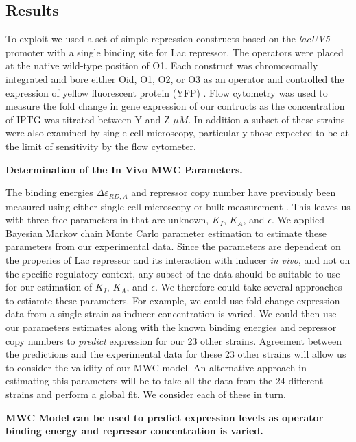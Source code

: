 \pagebreak
\subsection*{Results}

To exploit \eref[eq7] we used a set of simple repression constructs based on the \textit{lacUV5} promoter with a single binding site for Lac repressor. The operators were placed at the native wild-type position of O1. Each construct was chromosomally integrated and bore either Oid, O1, O2, or O3 as an operator and controlled the expression of yellow fluorescent protein (YFP) \cite{Garcia2011}. Flow cytometry was used to measure the fold change in gene expression of our contructs as the concentration of IPTG was titrated between Y and Z $\mu M$. In addition a subset of these strains were also examined by single cell microscopy, particularly those expected to be at the limit of sensitivity by the flow cytometer. 

\noindent \textbf{Determination of the In Vivo MWC Parameters.}

The binding energies $\Delta \varepsilon_{RD,A}$ and repressor copy number have previously been measured using either single-cell microscopy or bulk measurement \cite{Oehler1994,Vilar2003,Garcia2011, Brewster2014}. This leaves us with three free parameters in \eref[eq7] that are unknown, $K_I$, $K_A$, and $\epsilon$. We applied Bayesian Markov chain Monte Carlo parameter estimation to estimate these parameters from our experimental data. Since the parameters are dependent on the properies of Lac repressor and its interaction with inducer \textit{in vivo}, and not on the specific regulatory context, any subset of the data should be suitable to use for our estimation of $K_I$, $K_A$, and $\epsilon$. We therefore could take several approaches to estiamte these parameters. 
For example, we could use fold change expression data from a single strain as inducer concentration is varied. We could then use our parameters estimates along with the known binding energies and repressor copy numbers to \textit{predict} expression for our 23 other strains. Agreement between the predictions and the experimental data for these 23 other strains will allow us to consider the validity of our MWC model. An alternative approach in estimating this parameters will be to take all the data from the 24 different strains and perform a global fit. We consider each of these in turn.

\noindent \textbf{MWC Model can be used to predict expression levels as operator binding energy and repressor concentration is varied.}

